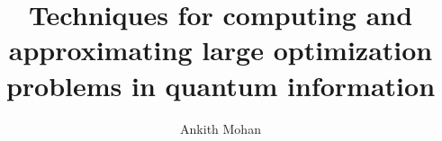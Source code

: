 \documentclass[doublespace,nopageskip]{VTthesis} %
\title{Techniques for computing and approximating large optimization problems in quantum information}
\author{Ankith Mohan}
\begin{document}
  \frontmatter
  \maketitle
  \tableofcontents

	\listoffigures
	 
    \printnomenclature %

	\mainmatter

	
	
	
    
    
    
	


    
    
\end{document}
